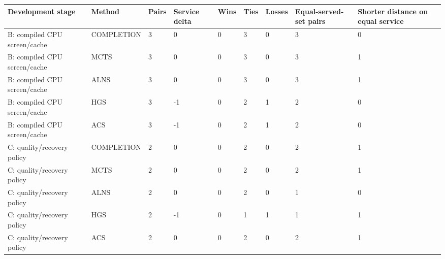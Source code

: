 \begin{tabular}{lllllllll}
\hline
Development stage & Method & Pairs & Service delta & Wins & Ties & Losses & Equal-served-set pairs & Shorter distance on equal service \\
\hline
B: compiled CPU screen/cache & COMPLETION & 3 & 0 & 0 & 3 & 0 & 3 & 0 \\
B: compiled CPU screen/cache & MCTS & 3 & 0 & 0 & 3 & 0 & 3 & 1 \\
B: compiled CPU screen/cache & ALNS & 3 & 0 & 0 & 3 & 0 & 3 & 1 \\
B: compiled CPU screen/cache & HGS & 3 & -1 & 0 & 2 & 1 & 2 & 0 \\
B: compiled CPU screen/cache & ACS & 3 & -1 & 0 & 2 & 1 & 2 & 0 \\
C: quality/recovery policy & COMPLETION & 2 & 0 & 0 & 2 & 0 & 2 & 1 \\
C: quality/recovery policy & MCTS & 2 & 0 & 0 & 2 & 0 & 2 & 1 \\
C: quality/recovery policy & ALNS & 2 & 0 & 0 & 2 & 0 & 1 & 0 \\
C: quality/recovery policy & HGS & 2 & -1 & 0 & 1 & 1 & 1 & 1 \\
C: quality/recovery policy & ACS & 2 & 0 & 0 & 2 & 0 & 2 & 1 \\
\hline
\end{tabular}
